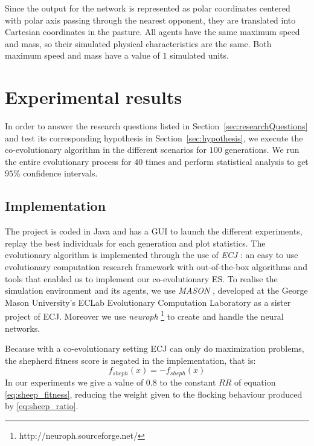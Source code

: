 \documentclass[conference]{IEEEtran}
\begin{document}
Since the output for the network is represented as polar coordinates centered with polar axis passing through the nearest opponent, they are translated into Cartesian coordinates in the pasture. 
All agents have the same maximum speed and mass, so their simulated physical characteristics are the same.
Both maximum speed and mass have a value of $1$ simulated units.



\section{Experimental results}
\label{sec:experiment}
In order to answer the research questions listed in {Section~\ref{sec:researchQuestions}} and test its corresponding hypothesis in {Section~\ref{sec:hypothesis}}, we execute the co-evolutionary algorithm in the different scenarios for $100$ generations. 
We run the entire evolutionary process for $40$ times and perform statistical analysis to get $95\%$ confidence intervals.

\subsection{Implementation}
\label{sec:implementation}
The project is coded in Java and has a GUI to launch the different experiments, replay the best individuals for each generation and plot statistics.
The evolutionary algorithm is implemented through the use of \textit{ECJ} \cite{luke2006ecj}: an easy to use evolutionary computation research framework with out-of-the-box algorithms and tools that enabled us to implement our co-evolutionary ES.
To realise the simulation environment and its agents, we use \textit{MASON} \cite{luke2005mason}, developed at the George Mason University's ECLab Evolutionary Computation Laboratory as a sister project of ECJ.
Moreover we use \textit{neuroph} \footnote{http://neuroph.sourceforge.net/} to create and handle the neural networks.

Because with a co-evolutionary setting ECJ can only do maximization problems, the shepherd fitness score is negated in the implementation, that is:
$$ f_{sheph}(x) = -f_{sheph}(x) $$
In our experiments we give a value of $0.8$ to the constant $RR$ of equation \eqref{eq:sheep_fitness}, reducing the weight given to the flocking behaviour produced by \eqref{eq:sheep_ratio}.
\end{document}
